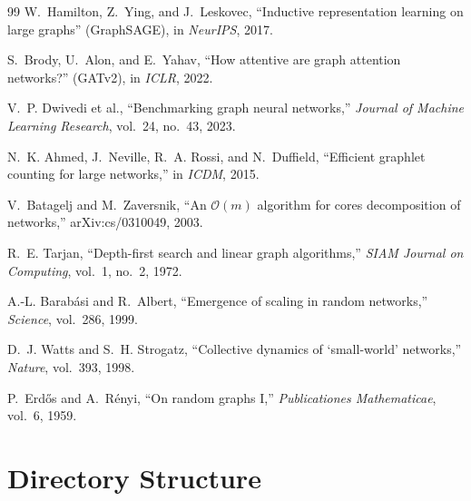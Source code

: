 \documentclass[10pt,a4paper]{report}
\theoremstyle{definition}
\begin{document}
\begin{thebibliography}{99}
	W.~Hamilton, Z.~Ying, and J.~Leskovec, ``Inductive representation learning
	on large graphs'' (GraphSAGE), in \emph{NeurIPS}, 2017.

	S.~Brody, U.~Alon, and E.~Yahav, ``How attentive are graph attention
	networks?'' (GATv2), in \emph{ICLR}, 2022.

	V.~P. Dwivedi et al., ``Benchmarking graph neural networks,''
	\emph{Journal of Machine Learning Research}, vol.~24, no.~43, 2023.

	N.~K. Ahmed, J.~Neville, R.~A. Rossi, and N.~Duffield,
	``Efficient graphlet counting for large networks,'' in \emph{ICDM}, 2015.

	V.~Batagelj and M.~Zaversnik, ``An $\mathcal{O}(m)$ algorithm for cores
	decomposition of networks,'' arXiv:cs/0310049, 2003.

	R.~E. Tarjan, ``Depth-first search and linear graph algorithms,''
	\emph{SIAM Journal on Computing}, vol.~1, no.~2, 1972.

	A.-L. Barab{\'a}si and R.~Albert, ``Emergence of scaling in random
	networks,'' \emph{Science}, vol.~286, 1999.

	D.~J. Watts and S.~H. Strogatz, ``Collective dynamics of `small-world'
	networks,'' \emph{Nature}, vol.~393, 1998.

	P.~Erd\H{o}s and A.~R{\'e}nyi, ``On random graphs I,''
	\emph{Publicationes Mathematicae}, vol.~6, 1959.

\end{thebibliography}

\appendix

\chapter{Directory Structure}
\end{document}
